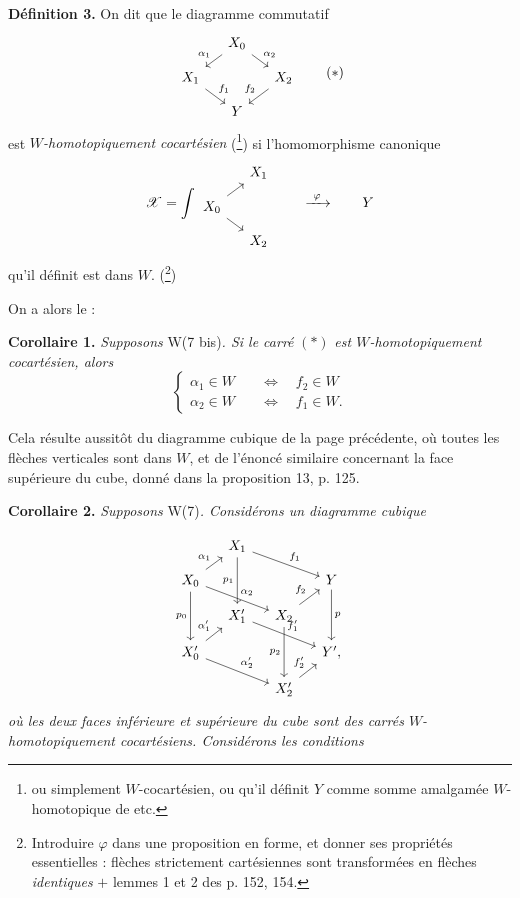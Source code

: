 \documentclass[11pt]{article}
\newcommand{\printedpage}[1]{\marginpar{\footnotesize p.~#1}}
\newcommand{\msp}[1]{\marginpar{\footnotesize [#1]}}
\newcommand{\sX}{\mathscr{X}}
\begin{document}
\setcounter{footnote}{85}
\textbf{Définition 3.} On dit que le diagramme commutatif
\[
\begin{tikzcd}[row sep=small, column sep=small]
 & X_0 \arrow[dl, "\alpha_1"'] \arrow[dr, "\alpha_2"] & \\
X_1 \arrow[dr, "f_1"] & & X_2 \arrow[dl, "f_2"'] \\
 & Y &
\end{tikzcd}
\tag*{$(*)$}
\]
est \textit{$W$-homotopiquement cocartésien} (\footnote{ou simplement $W$-cocartésien, ou qu'il définit $Y$ comme somme amalgamée $W$-homotopique de etc.}) si l'homomorphisme canonique
\[
\sX = \int
\begin{tikzcd}[row sep=small, column sep=small]
 & X_1 \\
X_0 \arrow[ur] \arrow[dr] & \\
 & X_2
\end{tikzcd}
\qquad \xrightarrow{\ \varphi\ } \qquad Y
\]
qu'il définit est dans $W$. (\footnote{Introduire $\varphi$ dans une proposition en forme, et donner ses propriétés essentielles : flèches strictement cartésiennes sont transformées en flèches \textit{identiques} $+$ lemmes 1 et 2 des p. 152, 154.})

\msp{page 132}
On a alors le :

\textbf{Corollaire 1.} \textit{Supposons} W(7 bis)\textit{. Si le carré} $(*)$ \textit{est $W$-homotopiquement cocartésien, alors}
\[
\left\{
\begin{aligned}
\alpha_1 \in W &\quad\iff\quad f_2 \in W \\
\alpha_2 \in W &\quad\iff\quad f_1 \in W.
\end{aligned}
\right.
\]

Cela résulte aussitôt du diagramme cubique de la page précédente, où toutes les flèches verticales sont dans $W$, et de l'énoncé similaire concernant la face supérieure du cube, donné dans la proposition 13, p. 125.

\textbf{Corollaire 2.} \textit{Supposons} W(7)\textit{. Considérons un diagramme cubique}

\printedpage{90}
\[
\begin{tikzcd}[row sep=small, column sep=small]
 & X_1 \arrow[dd, "p_1"'] \arrow[rrd, "f_1"] & & \\
X_0 \arrow[ru, "\alpha_1"] \arrow[rrd, "\alpha_2"] \arrow[dd, "p_0"'] & & & Y \arrow[dd, "p"] \\
 & X'_1 \arrow[rrd, "f'_1"] & X_2 \arrow[ru, "f_2"] \arrow[dd, "p_2"'] & \\
X'_0 \arrow[ru, "\alpha'_1"] \arrow[rrd, "\alpha'_2"] & & & Y', \\
 & & X'_2 \arrow[ru, "f'_2"] &
\end{tikzcd}
\]
\textit{où les deux faces inférieure et supérieure du cube sont des carrés $W$-homotopiquement cocartésiens. Considérons les conditions}
\end{document}
